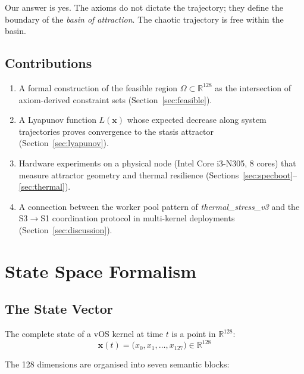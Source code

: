 \documentclass[11pt, a4paper]{article}
\newcommand{\R}{\mathbb{R}}
\newcommand{\sv}{\bm{x}}
\newcommand{\vOS}{\textsf{vOS}}
\begin{document}
Our answer is yes.
The axioms do not dictate the trajectory; they define the boundary of the
\emph{basin of attraction}.
The chaotic trajectory is free within the basin.

\subsection*{Contributions}

\begin{enumerate}
  \item A formal construction of the feasible region $\Omega \subset \R^{128}$
        as the intersection of axiom-derived constraint sets
        (Section~\ref{sec:feasible}).

  \item A Lyapunov function $L(\sv)$ whose expected decrease along
        system trajectories proves convergence to the stasis attractor
        (Section~\ref{sec:lyapunov}).

  \item Hardware experiments on a physical node (Intel Core i3-N305, 8 cores)
        that measure attractor geometry and thermal resilience
        (Sections~\ref{sec:specboot}--\ref{sec:thermal}).

  \item A connection between the worker pool pattern of \textit{thermal\_stress\_v3}
        and the S3$\to$S1 coordination protocol in multi-kernel deployments
        (Section~\ref{sec:discussion}).
\end{enumerate}


\section{State Space Formalism}
\label{sec:statespace}

\subsection{The State Vector}

The complete state of a \vOS{} kernel at time $t$ is a point in $\R^{128}$:
\begin{equation}
  \sv(t) = \bigl(x_0, x_1, \ldots, x_{127}\bigr) \in \R^{128}
\end{equation}

The 128 dimensions are organised into seven semantic blocks:
\end{document}
